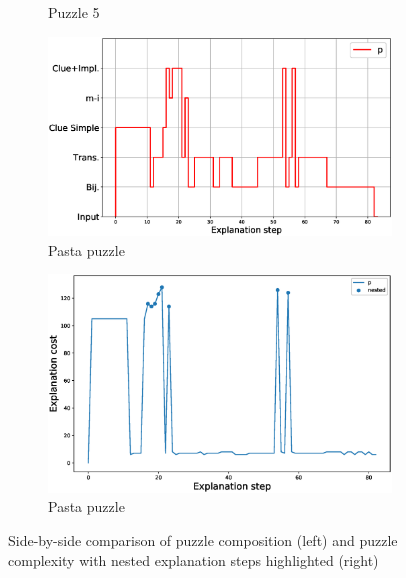 \begin{figure}
\begin{subfigure}{.5\textwidth}
		\caption{Puzzle 5 }
		\label{fig:cost_puzzle:p5}
	\end{subfigure}
	\begin{subfigure}{.5\textwidth}
		\centering
		\includegraphics[width=0.9\linewidth]{figures/plot_cost_steps_p.eps}
		\caption{Pasta puzzle}
		\label{fig:composition_puzzle:pasta}
	\end{subfigure}%
	\begin{subfigure}{.5\textwidth}
		\centering
		\includegraphics[width=0.84\linewidth]{figures/p.eps}
		\caption{Pasta puzzle}
		\label{fig:cost_puzzle:pasta}
	\end{subfigure}
	\caption{Side-by-side comparison of puzzle composition (left) and puzzle complexity with nested explanation steps highlighted (right)}
	\label{fig:steps}
\end{figure}



